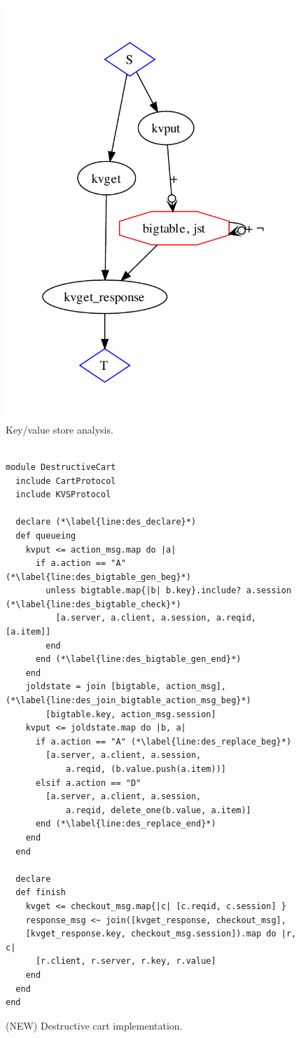 \begin{figure}[t]
\centering
\includegraphics[width=0.5\linewidth]{fig/basickvs.pdf}
\vspace{-10pt}
\caption{Key/value store analysis.}
\label{fig:pdg-kvs-analysis}
\vspace{-2pt}
\end{figure}




\begin{figure}[t]
\begin{scriptsize}
\begin{lstlisting}

module DestructiveCart
  include CartProtocol
  include KVSProtocol

  declare (*\label{line:des_declare}*)
  def queueing
    kvput <= action_msg.map do |a|
      if a.action == "A" (*\label{line:des_bigtable_gen_beg}*)
        unless bigtable.map{|b| b.key}.include? a.session (*\label{line:des_bigtable_check}*)
          [a.server, a.client, a.session, a.reqid, [a.item]]
        end
      end (*\label{line:des_bigtable_gen_end}*)
    end
    joldstate = join [bigtable, action_msg], (*\label{line:des_join_bigtable_action_msg_beg}*)
        [bigtable.key, action_msg.session]
    kvput <= joldstate.map do |b, a|
      if a.action == "A" (*\label{line:des_replace_beg}*)
        [a.server, a.client, a.session, 
            a.reqid, (b.value.push(a.item))]
      elsif a.action == "D"
        [a.server, a.client, a.session, 
            a.reqid, delete_one(b.value, a.item)]
      end (*\label{line:des_replace_end}*)
    end
  end

  declare
  def finish
    kvget <= checkout_msg.map{|c| [c.reqid, c.session] }
    response_msg <~ join([kvget_response, checkout_msg],
    [kvget_response.key, checkout_msg.session]).map do |r, c|
      [r.client, r.server, r.key, r.value]
    end
  end
end
\end{lstlisting}
\vspace{-10pt}
\caption{(NEW) Destructive cart implementation.}
\label{fig:dest_cart}
\end{scriptsize}
\vspace{-2pt}
\end{figure}





